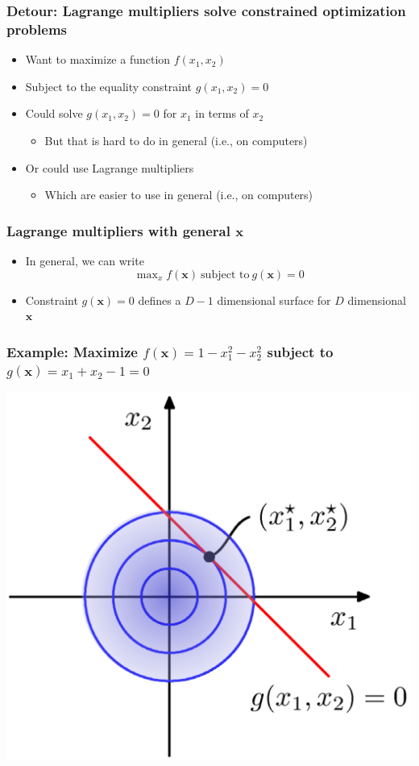 \documentclass[12pt,notes,mathserif]{beamer}
\begin{document}
\begin{frame}[c]
\frametitle{Detour: Lagrange multipliers solve constrained optimization problems}
\begin{itemize}
\item Want to maximize a function $f(x_1,x_2)$
\item Subject to the equality constraint $g(x_1,x_2)= 0$
\item Could solve $g(x_1,x_2)= 0$ for $x_1$ in terms of $x_2$
\begin{itemize}
\item But that is hard to do in general (i.e., on computers)
\end{itemize}
\item Or could use Lagrange multipliers
\begin{itemize}
\item Which are easier to use in general (i.e., on computers)
\end{itemize}
\end{itemize}
\end{frame}


\begin{frame}[c]
\frametitle{Lagrange multipliers with general $\bm{x}$}
\begin{itemize}
\item In general, we can write
\[
\max\nolimits_x f(\bm{x})~\text{subject~to}~g(\bm{x})=0
\]
\item Constraint $g(\bm{x})= 0$ defines a $D− 1$ dimensional surface for $D$ dimensional $\bm{x}$
\end{itemize}
\end{frame}


\begin{frame}[c]
\frametitle{Example: Maximize $f(\bm{x})=1-x_1^2-x_2^2$ subject to $g(\bm{x})=x_1+x_2-1=0$}
\begin{center}
\includegraphics[width=0.7\linewidth]{fig8/lec826.jpg}
\end{center}
\end{frame}
\end{document}
